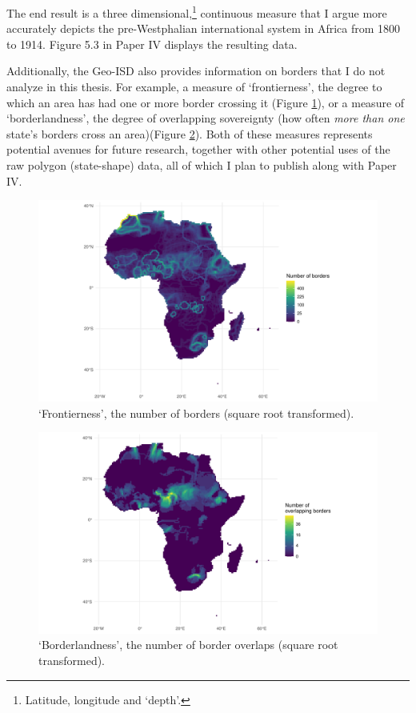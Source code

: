 The end result is a three dimensional,\footnote{Latitude, longitude and `depth'.}
continuous measure that I argue more accurately depicts the pre-Westphalian
international system in Africa from 1800 to 1914. Figure 5.3 in Paper IV
displays the resulting data. 

Additionally, the Geo-ISD also provides information on borders that I do not analyze
in this thesis. For example, a measure of `frontierness', the degree to
which an area has had one or more border crossing it (Figure \ref{fig:borders}),
or a measure of `borderlandness', the degree of overlapping sovereignty (how
often \textit{more than one} state's borders cross an area)(Figure
\ref{fig:overlaps}). Both of these measures represents potential avenues for
future research, together with other potential uses of the raw polygon
(state-shape) data, all of which I plan to publish along with Paper IV.

\begin{figure}[hpbt]
	\centering
	\includegraphics[width=\linewidth]{img/frontierplot.pdf}
	\caption{`Frontierness', the number of borders (square root transformed).}%
	\label{fig:borders}
\end{figure}

\begin{figure}[hpbt]
	\centering
	\includegraphics[width=\linewidth]{img/borderplot.pdf}
	\caption{`Borderlandness', the number of border overlaps (square root transformed).}%
	\label{fig:overlaps}
\end{figure}

